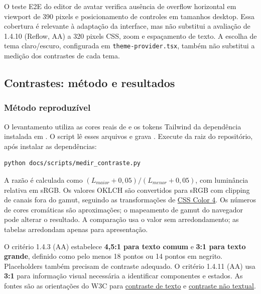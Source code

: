 \documentclass[12pt,a4paper]{article}
\begin{document}
O teste E2E do editor de avatar verifica ausência de overflow horizontal em viewport de 390 pixels e posicionamento de controles em tamanhos desktop. Essa cobertura é relevante à adaptação da interface, mas não substitui a avaliação de 1.4.10 (Reflow, AA) a 320 pixels CSS, zoom e espaçamento de texto. A escolha de tema claro/escuro, configurada em \texttt{theme-provider.tsx}, também não substitui a medição dos contrastes de cada tema.

\subsection{Contrastes: método e resultados}
\subsubsection{Método reproduzível}
O levantamento utiliza as cores reais de  e os tokens Tailwind da dependência instalada em . O script  lê esses arquivos e grava . Execute da raiz do repositório, após instalar as dependências:
\begin{verbatim}
python docs/scripts/medir_contraste.py
\end{verbatim}

A razão é calculada como $(L_{maior}+0{,}05)/(L_{menor}+0{,}05)$, com luminância relativa em sRGB. Os valores OKLCH são convertidos para sRGB com clipping de canais fora do gamut, seguindo as transformações de \href{https://www.w3.org/TR/css-color-4/\#color-conversion-code}{CSS Color 4}. Os números de cores cromáticas são aproximações; o mapeamento de gamut do navegador pode alterar o resultado. A comparação usa o valor sem arredondamento; as tabelas arredondam apenas para apresentação.

O critério 1.4.3 (AA) estabelece \textbf{4,5:1 para texto comum} e \textbf{3:1 para texto grande}, definido como pelo menos 18 pontos ou 14 pontos em negrito. Placeholders também precisam de contraste adequado. O critério 1.4.11 (AA) usa \textbf{3:1} para informação visual necessária a identificar componentes e estados. As fontes são as orientações do W3C para \href{https://www.w3.org/WAI/WCAG22/Understanding/contrast-minimum.html}{contraste de texto} e \href{https://www.w3.org/WAI/WCAG22/Understanding/non-text-contrast.html}{contraste não textual}.
\end{document}
